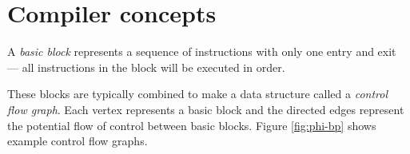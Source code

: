% 
%
% 
% 
% 
% 
% 
% 

\section{Compiler concepts}

A \emph{basic block} represents a sequence of instructions with only one entry and exit --- all
instructions
in the block will be executed in order.

These blocks are typically combined to make a data structure called a \emph{control flow graph}.
Each vertex represents a basic block and the directed edges represent the potential flow of
control between basic blocks. Figure \ref{fig:phi-bp} shows example control flow graphs.

